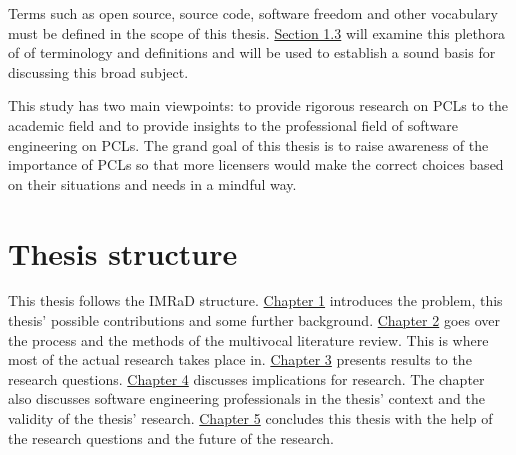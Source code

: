 Terms such as open source, source code, software freedom and other vocabulary must be defined in the scope of this thesis. \hyperref[sec:bg]{Section 1.3} will examine this plethora of of terminology and definitions and will be used to establish a sound basis for discussing this broad subject.

This study has two main viewpoints: to provide rigorous research on PCLs to the academic field and to provide insights to the professional field of software engineering on PCLs. The grand goal of this thesis is to raise awareness of the importance of PCLs so that more licensers would make the correct choices based on their situations and needs in a mindful way.

\section{Thesis structure}
This thesis follows the IMRaD structure. \hyperref[intro]{Chapter 1} introduces the problem, this thesis' possible contributions and some further background. \hyperref[methods]{Chapter 2} goes over the process and the methods of the multivocal literature review. This is where most of the actual research takes place in. \hyperref[results]{Chapter 3} presents results to the research questions. \hyperref[discussion]{Chapter 4} discusses implications for research. The chapter also discusses software engineering professionals in the thesis' context and the validity of the thesis' research. \hyperref[conclusions]{Chapter 5} concludes this thesis with the help of the research questions and the future of the research.

